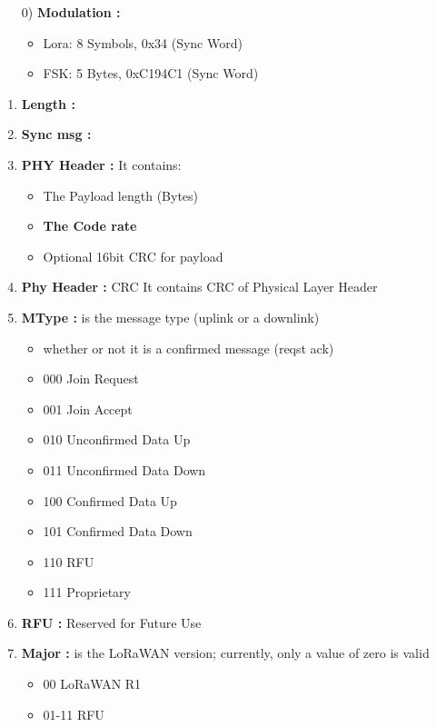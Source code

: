 \begin{landscape}
\scriptsize
\begin{multicols}{2}
\begin{itemize}
	\item[0)] \textbf{Modulation :}
	\begin{itemize}
		\item Lora:  8 Symbols, 0x34 (Sync Word)
		\item FSK:  5 Bytes, 0xC194C1 (Sync Word)
	\end{itemize}
\end{itemize}

\begin{enumerate}
	\item \textbf{Length :}
	\item \textbf{Sync msg :}
	\item \textbf{PHY Header :}  It contains:
	\begin{itemize}
		\item The Payload length (Bytes)
		\item \textbf{The Code rate}
		\item Optional 16bit CRC for payload 
	\end{itemize}
	\item \textbf{Phy Header :} CRC  It contains CRC of Physical Layer Header
	\item \textbf{MType :}  is the message type (uplink or a downlink)
	\begin{itemize}
		\item whether or not it is a confirmed message (reqst ack)
		\item 000 	Join Request
		\item 001 	Join Accept
		\item 010 	Unconfirmed Data Up
		\item 011 	Unconfirmed Data Down
		\item 100 	Confirmed Data Up
		\item 101 	Confirmed Data Down
		\item 110 	RFU
		\item 111 	Proprietary
	\end{itemize}
	\item \textbf{RFU :} Reserved for Future Use
	\item \textbf{Major :}  is the LoRaWAN version; currently, only a value of zero is valid
	\begin{itemize}
		\item 00 	LoRaWAN R1
		\item 01-11 	RFU
	\end{itemize}

\end{enumerate}
\end{multicols}
\end{landscape}

